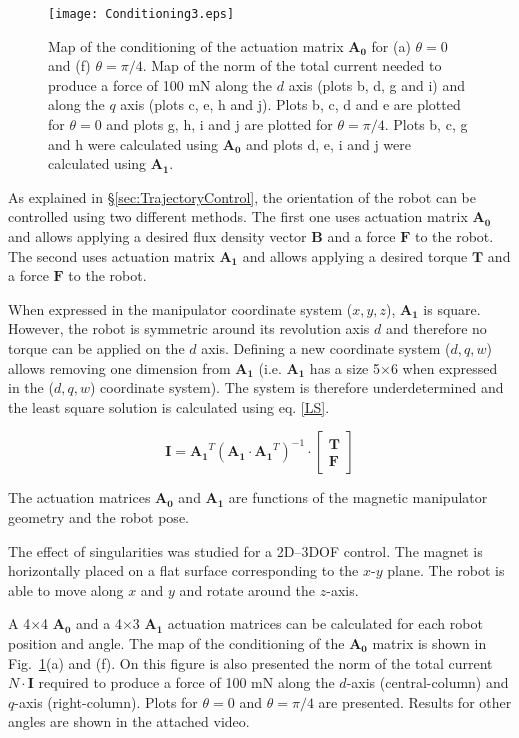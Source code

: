 \begin{figure}
	\texttt{[image: Conditioning3.eps]}
	\caption{Map of the conditioning of the actuation matrix $\mathbf{A_0}$ for (a) $\theta=0$ and (f) $\theta=\pi/4$. 
	Map of the norm of the total current needed to produce a force of 100 mN along the $d$ axis (plots b, d, g and i) and along the $q$ axis (plots c, e, h and j). 
	Plots b, c, d and e are plotted for $\theta=0$ and plots g, h, i and j are plotted for $\theta=\pi/4$.
	Plots b, c, g and h were calculated using $\mathbf{A_0}$ and plots d, e, i and j were calculated using $\mathbf{A_1}$. }
	\label{condition}
\end{figure}


As explained in \S\ref{sec:TrajectoryControl}, the orientation of the robot can be controlled using two different methods. 
 The first one uses actuation matrix $\mathbf{A_0}$ and allows applying a desired flux density vector $\mathbf{B}$ and a force $\mathbf{F}$ to the robot. 
 The second uses actuation matrix $\mathbf{A_1}$ and allows applying a desired torque $\mathbf{T}$ and a force $\mathbf{F}$ to the robot.

When expressed in the manipulator coordinate system ($x,y,z$), $\mathbf{A_1}$ is square. However, the robot is symmetric around its revolution axis $d$ and therefore no torque can be applied on the $d$ axis. Defining a new coordinate system ($d,q,w$) allows removing one dimension from $\mathbf{A_1}$ (i.e. $\mathbf{A_1}$ has a size 5$\times$6 when expressed in the ($d,q,w$) coordinate system). The system is therefore underdetermined and the least square solution is calculated using eq. \ref{LS}.
 
\begin{equation}
\label{LS}
\mathbf{I}=\mathbf{A_1}^{T}\left ( \mathbf{A_1} \cdot \mathbf{A_1}^{T} \right )^{-1}\cdot \begin{bmatrix}
\mathbf{T}
\\ 
\mathbf{F}
\end{bmatrix}
\end{equation}

The actuation matrices $\mathbf{A_0}$ and $\mathbf{A_1}$ are functions of the magnetic manipulator geometry and the robot pose. 

The effect of singularities was studied for a 2D--3DOF control. The magnet is horizontally placed on a flat surface corresponding to the $x$-$y$ plane. The robot is able to move along $x$ and $y$ and rotate around the $z$-axis.

A 4$\times$4 $\mathbf{A_0}$ and a 4$\times$3 $\mathbf{A_1}$ actuation matrices can be calculated for each robot position and angle. The map of the conditioning of the $\mathbf{A_0}$ matrix is shown in Fig.~\ref{condition}(a) and (f). On this figure is also presented the norm of the total current $N \cdot \mathbf{I}$ required to produce a force of 100 mN along the $d$-axis (central-column) and $q$-axis (right-column). Plots for $\theta=0$ and $\theta=\pi/4$ are presented. Results for other angles are shown in the attached video.  

